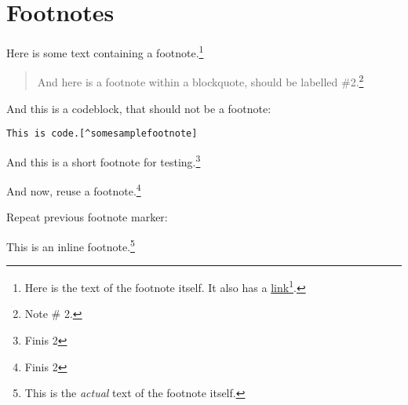 
\def\mytitle{MultiMarkdown Footer Test}


\part{Footnotes}
\label{footnotes}

Here is some text containing a footnote.\footnote{Here is the text of the footnote itself. It also has a \href{http://somelink.com}{link}\footnote{\href{http://somelink.com}{http:/\slash somelink.com}}.}

\begin{quote}

And here is a footnote within a blockquote, should be labelled \#2.\footnote{Note \# 2.}
\end{quote}

And this is a codeblock, that should not be a footnote:

\begin{verbatim}
This is code.[^somesamplefootnote]
\end{verbatim}

And this is a short footnote for testing.\footnote{Finis 2}

And now, reuse a footnote.\footnote{Finis 2}

Repeat previous footnote marker:

This is an inline footnote.\footnote{This is the \emph{actual} text of the footnote itself.}




